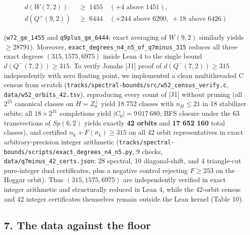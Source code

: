 \documentclass[11pt,a4paper]{article}
\begin{document}
\begin{align*}
d(W(7,2)) &\;\ge\; 1455 \quad (+4\text{ above }1451), \\
d(Q^+(9,2)) &\;\ge\; 6444 \quad (+244\text{ above }6200,\; +18\text{ above }6426)
\end{align*}

(\texttt{w72\_ge\_1455} and \texttt{q9plus\_ge\_6444}; exact averaging of \(W(9,2)\) similarly yields \(\ge 28791\)). Moreover,
\nolinkurl{exact_degrees_n4_n5_of_q7minus_315} reduces all three exact degrees \((315, 1575, 6975)\) inside Lean 4 to
the single bound \(d(Q^-(7,2)) \ge 315\). To verify Jonah\textquotesingle s {[}J1{]} proof of \(d(Q^-(7,2)) \ge 315\)
independently with zero floating point, we implemented a clean multithreaded C census from scratch
(\nolinkurl{tracks/spectral-bounds/src/w52_census_verify.c}, \nolinkurl{data/w52_orbits_42.tsv}), reproducing every count of {[}J1{]} without pruning
(all \(2^{25}\) canonical classes on \(H = Z_0^\perp\) yield 18 752 classes with \(n_H \le 21\) in 18
stabilizer orbits; all \(18 \times 2^{31}\) completions yield \(|C_0| = 9\,017\,680\); BFS closure under the
63 transvections of \(Sp(6,2)\) yields exactly \textbf{42 orbits} and \textbf{17 652 160} total classes), and
certified \(n_k + F(\sigma_k) \ge 315\) on all 42 orbit representatives in exact arbitrary-precision
integer arithmetic (\nolinkurl{tracks/spectral-bounds/scripts/exact_degrees_n4_n5.py}, 9 checks, \nolinkurl{data/q7minus_42_certs.json}: 28 spectral,
10 diagonal-shift, and 4 triangle-cut pure-integer dual certificates, plus a negative control rejecting
\(F \ge 253\) on the Hoggar orbit). Thus \((315, 1575, 6975)\) are independently verified in exact integer
arithmetic and structurally reduced in Lean 4, while the 42-orbit census and 42 integer certificates
themselves remain outside the Lean kernel (Table 10).

\subsection{7. The data against the floor}\label{7-the-data-against-the-floor}
\end{document}
